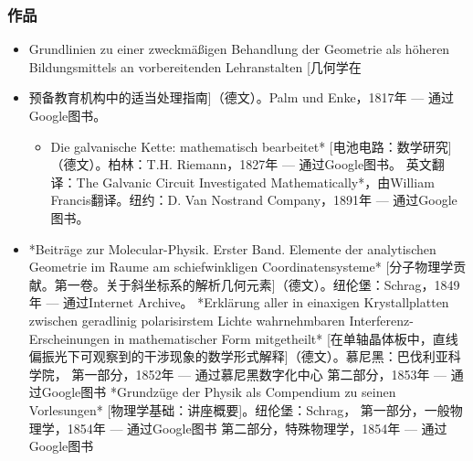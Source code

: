 \subsubsection{作品}  
\begin{itemize}
\item Grundlinien zu einer zweckmäßigen Behandlung der Geometrie als höheren Bildungsmittels an vorbereitenden Lehranstalten [几何学在\item 预备教育机构中的适当处理指南]（德文）。Palm und Enke，1817年 — 通过Google图书。  
\begin{itemize}
\item Die galvanische Kette: mathematisch bearbeitet* [电池电路：数学研究]（德文）。柏林：T.H. Riemann，1827年 — 通过Google图书。  
英文翻译：The Galvanic Circuit Investigated Mathematically*，由William Francis翻译。纽约：D. Van Nostrand Company，1891年 — 通过Google图书。
\end{itemize}  
\item *Beiträge zur Molecular-Physik. Erster Band. Elemente der analytischen Geometrie im Raume am schiefwinkligen Coordinatensysteme* [分子物理学贡献。第一卷。关于斜坐标系的解析几何元素]（德文）。纽伦堡：Schrag，1849年 — 通过Internet Archive。  
*Erklärung aller in einaxigen Krystallplatten zwischen geradlinig polarisirstem Lichte wahrnehmbaren Interferenz-Erscheinungen in mathematischer Form mitgetheilt* [在单轴晶体板中，直线偏振光下可观察到的干涉现象的数学形式解释]（德文）。慕尼黑：巴伐利亚科学院，  
第一部分，1852年 — 通过慕尼黑数字化中心  
第二部分，1853年 — 通过Google图书  
*Grundzüge der Physik als Compendium zu seinen Vorlesungen* [物理学基础：讲座概要]。纽伦堡：Schrag，  
第一部分，一般物理学，1854年 — 通过Google图书  
第二部分，特殊物理学，1854年 — 通过Google图书
\end{itemize}